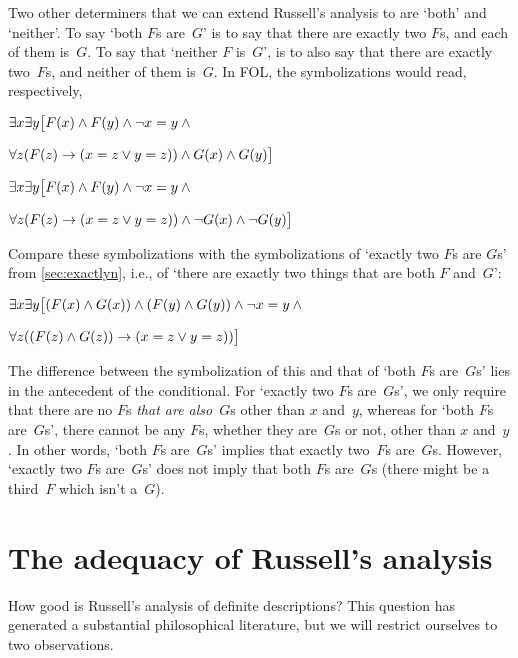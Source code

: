 Two other determiners that we can extend Russell's analysis to are `both' and `neither'.  To say `both $F$s are~$G$' is to say that there are exactly two $F$s, and each of them is~$G$. To say that `neither $F$ is~$G$', is to also say that there are exactly two~$F$s, and neither of them is~$G$. In FOL, the symbolizations would read, respectively,
\begin{earg}
	\item[] $\exists x\exists y\bigl[F(x) \wedge F(y) \wedge \neg x=y \wedge {}$
	\item[]\qquad$\forall z(F(z) \rightarrow (x = z \lor y = z)) \wedge G(x) \wedge G(y)\bigr]$
	\item[] $\exists x\exists y\bigl[F(x) \wedge F(y) \wedge \neg x=y \wedge  {}$
	\item[]\qquad$\forall z(F(z) \rightarrow (x = z \lor y = z)) \wedge \neg G(x) \wedge \neg G(y)\bigr]$
\end{earg}
Compare these symbolizations with the symbolizations of `exactly two $F$s are $G$s' from \cref{sec:exactlyn}, i.e., of `there are exactly two things that are both $F$ and~$G$':
\begin{earg}
	\item[] $\exists x\exists y\bigl[(F(x) \wedge G(x)) \wedge (F(y) \wedge G(y)) \wedge \neg x=y \wedge {}$
	\item[]\qquad$\forall z((F(z) \wedge G(z)) \rightarrow (x = z \lor y = z))\bigr]$
\end{earg}
The difference between the symbolization of this and that of `both $F$s are~$G$s' lies in the antecedent of the conditional. For `exactly two $F$s are~$G$s', we only require that there are no $F$s \emph{that are also}~$G$s other than $x$ and~$y$, whereas for `both $F$s are~$G$s', there cannot be any $F$s, whether they are~$G$s or not, other than $x$ and~$y$. In other words, `both $F$s are~$G$s' implies that exactly two~$F$s are~$G$s. However, `exactly two $F$s are~$G$s' does not imply that both $F$s are~$G$s (there might be a third~$F$ which isn't a~$G$).

\section{The adequacy of Russell's analysis}
How good is Russell's analysis of definite descriptions? This question has generated a substantial philosophical literature, but we will restrict ourselves to two observations.


